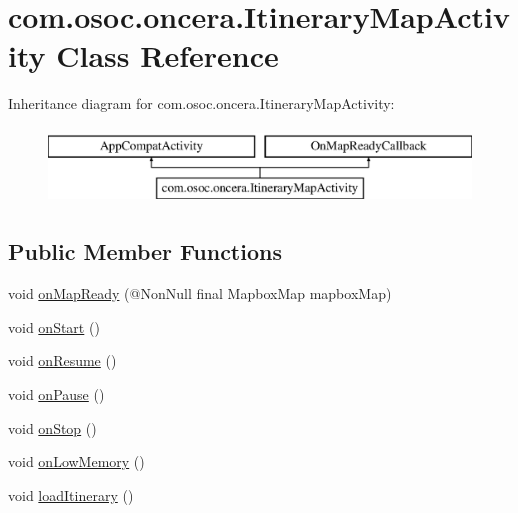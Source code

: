 \hypertarget{classcom_1_1osoc_1_1oncera_1_1_itinerary_map_activity}{}\section{com.\+osoc.\+oncera.\+Itinerary\+Map\+Activity Class Reference}
\label{classcom_1_1osoc_1_1oncera_1_1_itinerary_map_activity}
Inheritance diagram for com.\+osoc.\+oncera.\+Itinerary\+Map\+Activity\+:\begin{figure}[H]
\begin{center}
\leavevmode
\includegraphics[height=2.000000cm]{classcom_1_1osoc_1_1oncera_1_1_itinerary_map_activity}
\end{center}
\end{figure}
\subsection*{Public Member Functions}
\begin{DoxyCompactItemize}
\item 
void \mbox{\hyperlink{classcom_1_1osoc_1_1oncera_1_1_itinerary_map_activity_a3db36e989b85f05968b515833e1d7833}{on\+Map\+Ready}} (@Non\+Null final Mapbox\+Map mapbox\+Map)
\item 
void \mbox{\hyperlink{classcom_1_1osoc_1_1oncera_1_1_itinerary_map_activity_a1e3e638d36340b03019db8e8f66e1fcf}{on\+Start}} ()
\item 
void \mbox{\hyperlink{classcom_1_1osoc_1_1oncera_1_1_itinerary_map_activity_a36f774643a788173b1ed2ab780c3987d}{on\+Resume}} ()
\item 
void \mbox{\hyperlink{classcom_1_1osoc_1_1oncera_1_1_itinerary_map_activity_a7da044f0bf9bd5f9720398bcc27b3e3a}{on\+Pause}} ()
\item 
void \mbox{\hyperlink{classcom_1_1osoc_1_1oncera_1_1_itinerary_map_activity_afe7755630a6458cf950614f854fa50f9}{on\+Stop}} ()
\item 
void \mbox{\hyperlink{classcom_1_1osoc_1_1oncera_1_1_itinerary_map_activity_ab7721ae33544695f2a4670d52d98b1e2}{on\+Low\+Memory}} ()
\item 
void \mbox{\hyperlink{classcom_1_1osoc_1_1oncera_1_1_itinerary_map_activity_a78e3228f400a80bc723880d90dcf58a4}{load\+Itinerary}} ()
\end{DoxyCompactItemize}
